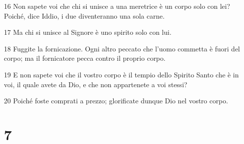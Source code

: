 \par 16 Non sapete voi che chi si unisce a una meretrice è un corpo solo con lei? Poiché, dice Iddio, i due diventeranno una sola carne.
\par 17 Ma chi si unisce al Signore è uno spirito solo con lui.
\par 18 Fuggite la fornicazione. Ogni altro peccato che l'uomo commetta è fuori del corpo; ma il fornicatore pecca contro il proprio corpo.
\par 19 E non sapete voi che il vostro corpo è il tempio dello Spirito Santo che è in voi, il quale avete da Dio, e che non appartenete a voi stessi?
\par 20 Poiché foste comprati a prezzo; glorificate dunque Dio nel vostro corpo.

\chapter{7}


